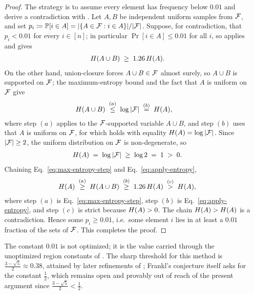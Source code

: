 \begin{proof}
The strategy is to assume every element has frequency below $0.01$ and derive a
contradiction with . Let $A, B$ be independent uniform
samples from $\mathcal{F}$, and set $p_i \coloneqq \mathbb{P}[i \in A] = |\{A \in \mathcal{F} : i \in A\}| / |\mathcal{F}|$.
Suppose, for contradiction, that $p_i < 0.01$ for every $i \in [n]$; in
particular $\Pr[i \in A] \le 0.01$ for all $i$, so 
applies and gives
\begin{align}
H(A \cup B) \;\ge\; 1.26\,H(A). \label{eq:apply-entropy}
\end{align}
On the other hand, union-closure forces $A \cup B \in \mathcal{F}$ almost surely, so
$A \cup B$ is supported on $\mathcal{F}$; the maximum-entropy bound
 and the fact that $A$ is uniform on $\mathcal{F}$ give
\begin{align}
H(A \cup B)
&\;\overset{(a)}{\le}\; \log|\mathcal{F}|
\;\overset{(b)}{=}\; H(A), \label{eq:max-entropy-step}
\end{align}
where step $(a)$ applies  to the $\mathcal{F}$-supported variable
$A \cup B$, and step $(b)$ uses that $A$ is uniform on $\mathcal{F}$, for which
 holds with equality $H(A) = \log|\mathcal{F}|$. Since
$|\mathcal{F}| \ge 2$, the uniform distribution on $\mathcal{F}$ is non-degenerate, so
\begin{align*}
H(A) \;=\; \log|\mathcal{F}| \;\ge\; \log 2 \;=\; 1 \;>\; 0.
\end{align*}
Chaining Eq.~\eqref{eq:max-entropy-step} and Eq.~\eqref{eq:apply-entropy},
\begin{align*}
H(A)
\;\overset{(a)}{\ge}\; H(A \cup B)
\;\overset{(b)}{\ge}\; 1.26\,H(A)
\;\overset{(c)}{>}\; H(A),
\end{align*}
where step $(a)$ is Eq.~\eqref{eq:max-entropy-step}, step $(b)$ is
Eq.~\eqref{eq:apply-entropy}, and step $(c)$ is strict because $H(A) > 0$.
The chain $H(A) > H(A)$ is a contradiction. Hence some $p_i \ge 0.01$,
i.e.\ some element $i$ lies in at least a $0.01$ fraction of the sets of $\mathcal{F}$.
This completes the proof.
\end{proof}

\begin{remark}
\label{rem:constant}
The constant $0.01$ is not optimized; it is the value carried through the
unoptimized region constants of . The sharp
threshold for this method is $\tfrac{3 - \sqrt{5}}{2} \approx 0.38$, attained by
later refinements of ; Frankl's conjecture itself asks for
the constant $\tfrac{1}{2}$, which remains open and provably out of reach of the
present argument since $\tfrac{3 - \sqrt 5}{2} < \tfrac{1}{2}$.
\end{remark}
